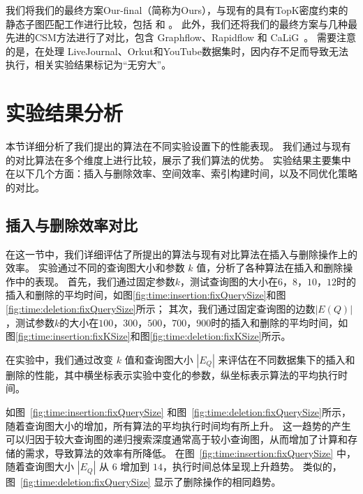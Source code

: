 我们将我们的最终方案Our-final（简称为Ours），与现有的具有TopK密度约束的静态子图匹配工作进行比较，包括 \itk\cite{static-topk-Gupta-DBLP:conf/icde/GuptaGYCH14} 和 \pm\cite{static-topk-Chen-DBLP:journals/ijprai/ChenLCTL18}。
此外，我们还将我们的最终方案与几种最先进的CSM方法进行了对比，包含 Graphflow\cite{csm-graphflow-DBLP:conf/sigmod/KankanamgeSMCS17}、Rapidflow\cite{csm-rapidflow-DBLP:journals/pvldb/SunSHL22} 和 CaLiG~\cite{csm-calig-DBLP:journals/pacmmod/YangZZY23}。
需要注意的是，\itk 在处理 LiveJournal、Orkut和YouTube数据集时，因内存不足而导致无法执行，相关实验结果标记为“无穷大”。

\section{实验结果分析}
\label{ch5:overall-compare}
本节详细分析了我们提出的算法在不同实验设置下的性能表现。
我们通过与现有的对比算法在多个维度上进行比较，展示了我们算法的优势。
实验结果主要集中在以下几个方面：插入与删除效率、空间效率、索引构建时间，以及不同优化策略的对比。
\subsection{插入与删除效率对比}
\label{ch5:insertion-deletion}
在这一节中，我们详细评估了所提出的算法与现有对比算法在插入与删除操作上的效率。
实验通过不同的查询图大小和参数 $k$ 值，分析了各种算法在插入和删除操作中的表现。
首先，我们通过固定参数$k$，测试查询图的大小在$6$，$8$，$10$，$12$时的插入和删除的平均时间，如图\ref{fig:time:insertion:fixQuerySize}和图\ref{fig:time:deletion:fixQuerySize}所示；
其次，我们通过固定查询图的边数$|E(Q)|$，测试参数$k$的大小在$100$，$300$，$500$，$700$，$900$时的插入和删除的平均时间，如图\ref{fig:time:insertion:fixKSize}和图\ref{fig:time:deletion:fixKSize}所示。






在实验中，我们通过改变 $k$ 值和查询图大小 $|E_Q|$ 来评估在不同数据集下的插入和删除的性能，其中横坐标表示实验中变化的参数，纵坐标表示算法的平均执行时间。



如图~\ref{fig:time:insertion:fixQuerySize} 和图~\ref{fig:time:deletion:fixQuerySize}所示，随着查询图大小的增加，所有算法的平均执行时间均有所上升。
这一趋势的产生可以归因于较大查询图的递归搜索深度通常高于较小查询图，从而增加了计算和存储的需求，导致算法的效率有所降低。
在图~\ref{fig:time:insertion:fixQuerySize} 中，随着查询图大小 $|E_Q|$ 从 $6$ 增加到 $14$，执行时间总体呈现上升趋势。
类似的，图~\ref{fig:time:deletion:fixQuerySize} 显示了删除操作的相同趋势。

